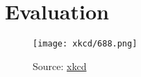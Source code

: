 \chapter{Evaluation}
\label{cha:evaluation}

\begin{figure}[h]
    \centering
    \texttt{[image: xkcd/688.png]}
    \caption*{Source: \href{https://xkcd.com/688/}{xkcd}}
\end{figure}


